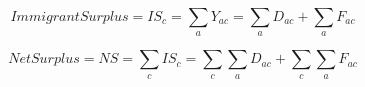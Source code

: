 \begin{equation}\label{eq:dc3}
  Immigrant Surplus =IS_{c} = \displaystyle\sum_{a}Y_{ac} = \displaystyle\sum_{a}D_{ac} + \displaystyle\sum_{a}F_{ac}
\end{equation}

\begin{equation}\label{eq:dc4}
  Net Surplus = NS = \displaystyle\sum_{c}IS_{c} = \displaystyle\sum_{c}\displaystyle\sum_{a}D_{ac} + \displaystyle\sum_{c}\displaystyle\sum_{a}F_{ac}
\end{equation}

